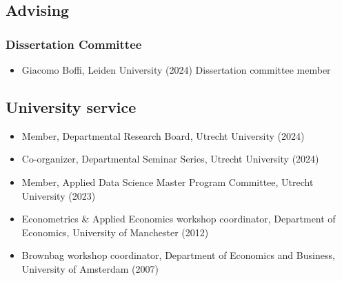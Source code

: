 \documentclass[11pt]{article}
\begin{document}
{\begin{itemize}[leftmargin=20pt]
\end{itemize}

\subsection*{\sc Advising}
\subsubsection*{Dissertation Committee}

\begin{itemize}[leftmargin=20pt]
    \itemsep-.1cm
    \item[]  Giacomo Boffi, Leiden University (2024) Dissertation committee member
\end{itemize}


\subsection*{\sc University service}
\begin{itemize}[leftmargin=20pt]
    \itemsep-.1cm
    \item[] Member, Departmental Research Board, Utrecht University (2024\textendash)
    \item[] Co-organizer, Departmental Seminar Series, Utrecht University (2024\textendash)
    \item[] Member, Applied Data Science Master Program Committee, Utrecht University (2023\textendash)
    \item[] Econometrics \& Applied Economics workshop coordinator, Department of Economics, University of Manchester (2012)
    \item[] Brownbag workshop coordinator, Department of Economics and Business, University of Amsterdam (2007)
\end{itemize}

}
\end{document}
